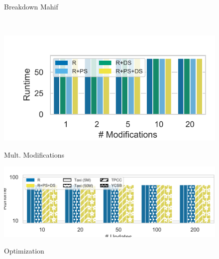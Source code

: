 \begin{figure}[t]
\begin{minipage}[b]{0.34\linewidth}
               \caption{Breakdown                                     Mahif}
               \label{fig:Mahif                                       Method}
\end{minipage} \\
               \begin{minipage}[b]{0.245\linewidth}
               \centering
               \includegraphics[width=0.95\linewidth,trim=7 5 0                                     0,                             clip]{imgs/felix_multimod.pdf}           \\
               \vspace{-3mm}
               \caption{Mult. Modifications}
               \label{fig:Multimod}
\end{minipage}
\begin{minipage}[b]{0.275\linewidth}
               \hspace{-0.4cm}
               \includegraphics[width=1.2\linewidth,trim=0            0 0                                     0,                             clip]{imgs/felix_optimizations.pdf}      \\
               \vspace{-8mm}
               \caption{Optimization}
               \label{fig:optimization}
               \end{minipage}
               \begin{minipage}[b]{0.235\linewidth}

\end{minipage}
\end{figure}
